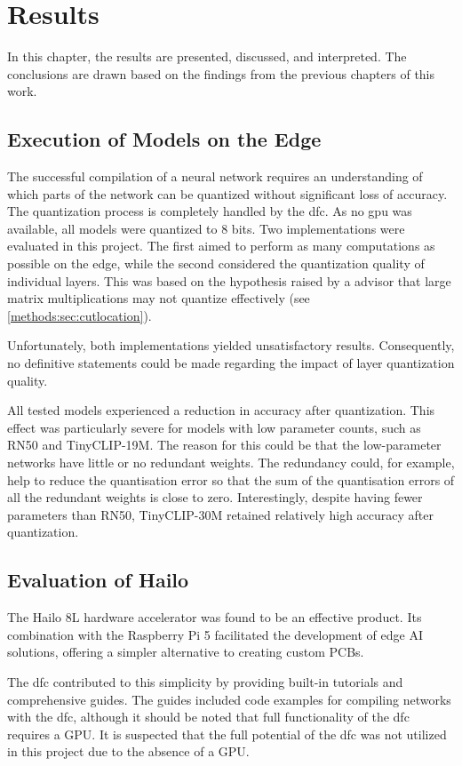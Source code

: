 \chapter{Results}  
In this chapter, the results are presented, discussed, and interpreted.  
The conclusions are drawn based on the findings from the previous chapters of this work.  

\section{Execution of Models on the Edge}  
The successful compilation of a neural network requires an understanding of which parts of the network can be quantized without significant loss of accuracy.
The quantization process is completely handled by the \acrshort{dfc}.
As no \acrshort{gpu} was available, all models were quantized to 8 bits. 
Two implementations were evaluated in this project.  
The first aimed to perform as many computations as possible on the edge, while the second considered the quantization quality of individual layers.  
This was based on the hypothesis raised by a advisor that large matrix multiplications may not quantize effectively (see \cref{methods:sec:cutlocation}).
  

Unfortunately, both implementations yielded unsatisfactory results.  
Consequently, no definitive statements could be made regarding the impact of layer quantization quality.  

All tested models experienced a reduction in accuracy after quantization.  
This effect was particularly severe for models with low parameter counts, such as RN50 and TinyCLIP-19M.
The reason for this could be that the low-parameter networks have little or no redundant weights.
The redundancy could, for example, help to reduce the quantisation error so that the sum of the quantisation errors of all the redundant weights is close to zero.
Interestingly, despite having fewer parameters than RN50, TinyCLIP-30M retained relatively high accuracy after quantization.    

\section{Evaluation of Hailo}  
The Hailo 8L hardware accelerator was found to be an effective product.  
Its combination with the Raspberry Pi 5 facilitated the development of edge AI solutions, offering a simpler alternative to creating custom PCBs.  

The \acrshort{dfc} contributed to this simplicity by providing built-in tutorials and comprehensive guides.  
The guides included code examples for compiling networks with the \acrshort{dfc}, although it should be noted that full functionality of the \acrshort{dfc} requires a GPU. 
It is suspected that the full potential of the \acrshort{dfc} was not utilized in this project due to the absence of a GPU.  

